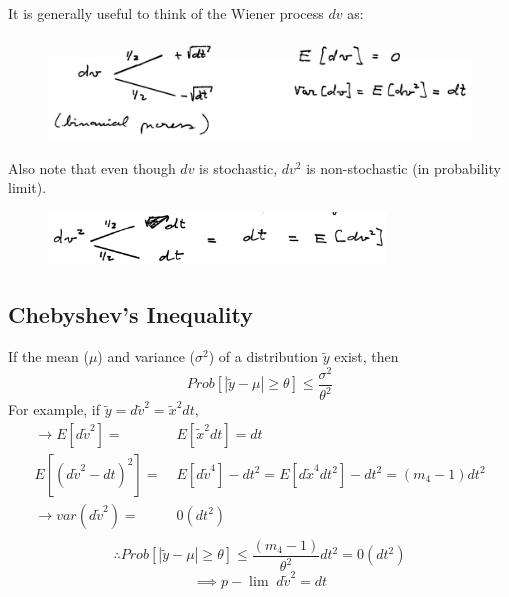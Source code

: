 \documentclass[
14pt,notheorems,hyperref={pdfauthor=whatever}
]{beamer}
\begin{document}
\begin{frame}
It is generally useful to think of the Wiener process $dv$ as:\\
\begin{figure}[diffusion]
    \includegraphics[width=1\textwidth]{images/L8-wiener.png}
    \centering
\end{figure}
Also note that even though $dv$ is stochastic, $dv^2$ is non-stochastic (in probability limit).
\begin{figure}[diffusion]
    \includegraphics[width=0.8\textwidth]{images/L8-wiener2.png}
    \centering
\end{figure}
\end{frame}

\subsection{Chebyshev's Inequality}
\begin{frame}
If the mean ($\mu$) and variance ($\sigma^2$) of a distribution $\tilde{y}$ exist, then\\
\[Prob[|\tilde y - \mu| \geq \theta] \leq \frac{\sigma^2}{\theta^2}\]
For example, if $\tilde{y} = d\tilde{v}^2 = \tilde x^2 dt$,\\
\begin{align*}
    \longrightarrow E[d\tilde{v}^2] =&\; E[\tilde{x}^2 dt] = dt\\
    E[(d\tilde{v}^2 - dt)^2] =&\; E[d\tilde{v}^4] - dt^2 = E[d\tilde{x}^4 dt^2] - dt^2 = (m_4 - 1)dt^2\\
    \longrightarrow var(d\tilde{v}^2) =&\; 0 (dt^2)\\
\end{align*}
\[\therefore Prob[|\tilde y - \mu| \geq \theta] \leq \frac{(m_4-1)}{\theta^2}dt^2 = 0(dt^2)\]
\[\implies {p\!\!-\!\!\lim}\; d\tilde{v}^2 = dt\]
\end{frame}
\end{document}
